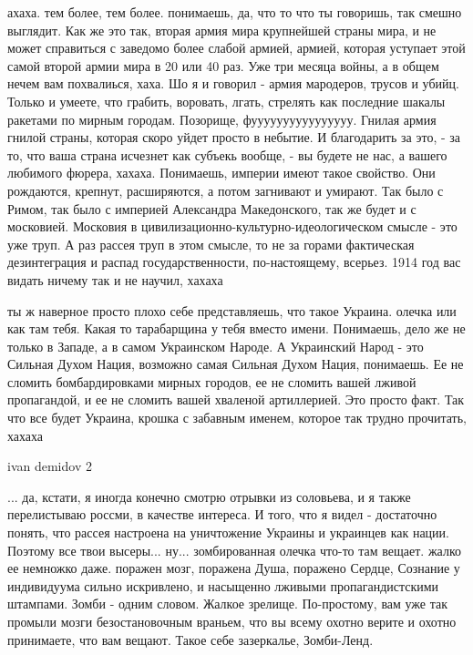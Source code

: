 ахаха. тем более, тем более. понимаешь, да, что то что ты говоришь, так смешно
выглядит. Как же это так, вторая армия мира крупнейшей страны мира, и не может
справиться с заведомо более слабой армией, армией, которая уступает этой самой
второй армии мира в 20 или 40 раз. Уже три месяца войны, а в общем нечем вам
похвалиься, хаха. Шо я и говорил - армия мародеров, трусов и убийц. Только и
умеете, что грабить, воровать, лгать, стрелять как последние шакалы ракетами по
мирным городам. Позорище, фуууууууууууууууу. Гнилая армия гнилой страны,
которая скоро уйдет просто в небытие. И благодарить за это, - за то, что ваша
страна исчезнет как субъекь вообще, - вы будете не нас, а вашего любимого
фюрера, хахаха. Понимаешь, империи имеют такое свойство. Они рождаются,
крепнут, расширяются, а потом загнивают и умирают. Так было с Римом, так было с
империей Александра Македонского, так же будет и с московией. Московия в
цивилизационно-культурно-идеологическом смысле - это уже труп. А раз рассея
труп в этом смысле, то не за горами фактическая дезинтеграция и распад
государственности, по-настоящему, всерьез. 1914 год вас видать ничему так и не
научил, хахаха

ты ж наверное просто плохо себе представляешь, что такое Украина. олечка или
как там тебя. Какая то тарабарщина у тебя вместо имени. Понимаешь, дело же не
только в Западе, а в самом Украинском Народе. А Украинский Народ - это Сильная
Духом Нация, возможно самая Сильная Духом Нация, понимаешь. Ее не сломить
бомбардировками мирных городов, ее не сломить вашей лживой пропагандой, и ее не
сломить вашей хваленой артиллерией. Это просто факт. Так что все будет Украина,
крошка с забавным именем, которое так трудно прочитать, хахаха

ivan demidov 2

... да, кстати, я иногда конечно смотрю отрывки из соловьева, и я также
перелистываю россми, в качестве интереса. И того, что я видел - достаточно
понять, что рассея настроена на уничтожение Украины и украинцев как нации.
Поэтому все твои высеры... ну... зомбированная олечка что-то там вещает. жалко
ее немножко даже. поражен мозг, поражена Душа, поражено Сердце, Сознание у
индивидуума сильно искривлено, и насыщенно лживыми пропагандистскими штампами.
Зомби - одним словом. Жалкое зрелище. По-простому, вам уже так промыли мозги
безостановочным враньем, что вы всему охотно верите и охотно принимаете, что
вам вещают. Такое себе зазеркалье, Зомби-Ленд.

